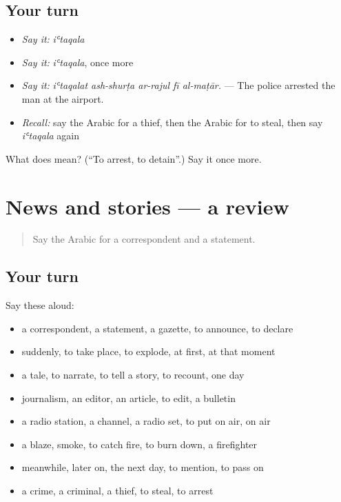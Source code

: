 \subsection*{Your turn}
\begin{itemize}
\raggedright
  \item \emph{Say it:} \emph{iʿtaqala}
  \item \emph{Say it:} \emph{iʿtaqala}, once more
  \item \emph{Say it:} \emph{iʿtaqalat ash-shurṭa ar-rajul fī al-maṭār.} — The police arrested the man at the airport.
  \item \emph{Recall:} say the Arabic for a thief, then the Arabic for to steal, then say \emph{iʿtaqala} again
\end{itemize}

\begin{tcolorbox}[breakable,colback=teal!4,colframe=teal!35!black,title={Before you move on}]
What does  mean? (\textquotedblleft{}To arrest, to detain\textquotedblright{}.) Say it once more.
\end{tcolorbox}
\section[(dialogue)]{News and stories — a review}

\label{lesson:AR-R300-review-293-300}



\begin{quote}
Say the Arabic for a correspondent and a statement.
\end{quote}

\subsection*{Your turn}
Say these aloud:

\begin{itemize}
\raggedright
  \item a correspondent, a statement, a gazette, to announce, to declare
  \item suddenly, to take place, to explode, at first, at that moment
  \item a tale, to narrate, to tell a story, to recount, one day
  \item journalism, an editor, an article, to edit, a bulletin
  \item a radio station, a channel, a radio set, to put on air, on air
  \item a blaze, smoke, to catch fire, to burn down, a firefighter
  \item meanwhile, later on, the next day, to mention, to pass on
  \item a crime, a criminal, a thief, to steal, to arrest
\end{itemize}

